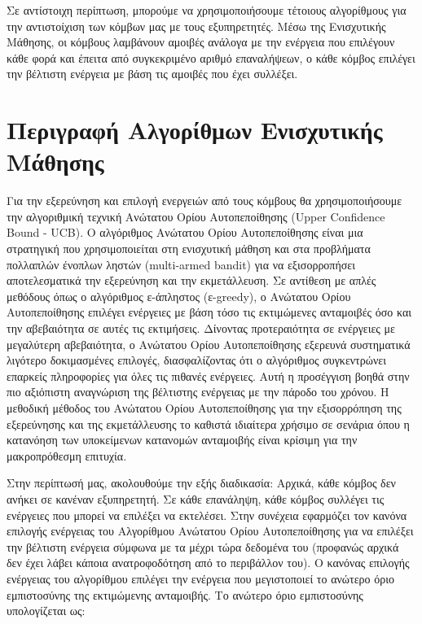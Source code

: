 Σε αντίστοιχη περίπτωση, μπορούμε να χρησιμοποιήσουμε τέτοιους αλγορίθμους για την αντιστοίχιση των κόμβων μας με τους εξυπηρετητές. Μέσω της Ενισχυτικής Μάθησης, οι κόμβους λαμβάνουν αμοιβές ανάλογα με την ενέργεια που επιλέγουν κάθε φορά και έπειτα από συγκεκριμένο αριθμό επαναλήψεων, ο κάθε κόμβος επιλέγει την βέλτιστη ενέργεια με βάση τις αμοιβές που έχει συλλέξει. 

\section{Περιγραφή Αλγορίθμων Ενισχυτικής Μάθησης}

Για την εξερεύνηση και επιλογή ενεργειών από τους κόμβους θα χρησιμοποιήσουμε την αλγοριθμική τεχνική Ανώτατου Ορίου Αυτοπεποίθησης (Upper Confidence Bound - UCB). Ο αλγόριθμος Ανώτατου Ορίου Αυτοπεποίθησης είναι μια στρατηγική που χρησιμοποιείται στη ενισχυτική μάθηση και στα προβλήματα πολλαπλών ένοπλων ληστών (multi-armed bandit) για να εξισορροπήσει αποτελεσματικά την εξερεύνηση και την εκμετάλλευση. Σε αντίθεση με απλές μεθόδους όπως ο αλγόριθμος ε-άπληστος (ε-greedy), ο Ανώτατου Ορίου Αυτοπεποίθησης επιλέγει ενέργειες με βάση τόσο τις εκτιμώμενες ανταμοιβές όσο και την αβεβαιότητα σε αυτές τις εκτιμήσεις. Δίνοντας προτεραιότητα σε ενέργειες με μεγαλύτερη αβεβαιότητα, ο Ανώτατου Ορίου Αυτοπεποίθησης εξερευνά συστηματικά λιγότερο δοκιμασμένες επιλογές, διασφαλίζοντας ότι ο αλγόριθμος συγκεντρώνει επαρκείς πληροφορίες για όλες τις πιθανές ενέργειες. Αυτή η προσέγγιση βοηθά στην πιο αξιόπιστη αναγνώριση της βέλτιστης ενέργειας με την πάροδο του χρόνου. Η μεθοδική μέθοδος του Ανώτατου Ορίου Αυτοπεποίθησης για την εξισορρόπηση της εξερεύνησης και της εκμετάλλευσης το καθιστά ιδιαίτερα χρήσιμο σε σενάρια όπου η κατανόηση των υποκείμενων κατανομών ανταμοιβής είναι κρίσιμη για την μακροπρόθεσμη επιτυχία.

Στην περίπτωσή μας, ακολουθούμε την εξής διαδικασία: Αρχικά, κάθε κόμβος δεν ανήκει σε κανέναν εξυπηρετητή. Σε κάθε επανάληψη, κάθε κόμβος συλλέγει τις ενέργειες που μπορεί να επιλέξει να εκτελέσει. Στην συνέχεια εφαρμόζει τον κανόνα επιλογής ενέργειας του Αλγορίθμου Ανώτατου Ορίου Αυτοπεποίθησης για να επιλέξει την βέλτιστη ενέργεια σύμφωνα με τα μέχρι τώρα δεδομένα του (προφανώς αρχικά δεν έχει λάβει κάποια ανατροφοδότηση από το περιβάλλον του). Ο κανόνας επιλογής ενέργειας του αλγορίθμου επιλέγει την ενέργεια που μεγιστοποιεί το ανώτερο όριο εμπιστοσύνης της εκτιμώμενης ανταμοιβής. Το ανώτερο όριο εμπιστοσύνης υπολογίζεται ως:

